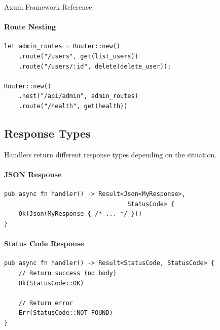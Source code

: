 \begin{deepdive}{Axum Framework Reference}
\paragraph{Route Nesting}

\begin{listing}[H]
\caption{Route nesting and merging}
\label{lst:axum-nesting}
\begin{verbatim}
let admin_routes = Router::new()
    .route("/users", get(list_users))
    .route("/users/:id", delete(delete_user));

Router::new()
    .nest("/api/admin", admin_routes)
    .route("/health", get(health))
\end{verbatim}
\end{listing}

\subsection{Response Types}

Handlers return different response types depending on the situation.

\paragraph{JSON Response}

\begin{listing}[H]
\caption{JSON response type}
\label{lst:axum-json-response}
\begin{verbatim}
pub async fn handler() -> Result<Json<MyResponse>,
                                  StatusCode> {
    Ok(Json(MyResponse { /* ... */ }))
}
\end{verbatim}
\end{listing}

\paragraph{Status Code Response}

\begin{listing}[H]
\caption{Status code response}
\label{lst:axum-status-response}
\begin{verbatim}
pub async fn handler() -> Result<StatusCode, StatusCode> {
    // Return success (no body)
    Ok(StatusCode::OK)

    // Return error
    Err(StatusCode::NOT_FOUND)
}
\end{verbatim}
\end{listing}


\end{deepdive}
